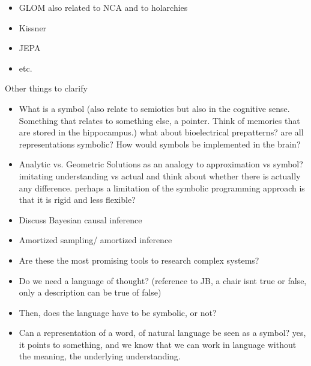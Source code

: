 \begin{itemize}
    \item GLOM also related to NCA and to holarchies
    \item Kissner
    \item JEPA
    \item etc. 
\end{itemize}










Other things to clarify
\begin{itemize}
    \item What is a symbol (also relate to semiotics but also in the cognitive sense. Something that relates to something else, a pointer. Think of memories that are stored in the hippocampus.) what about bioelectrical prepatterns? are all representations symbolic? How would symbols be implemented in the brain?
    \item Analytic vs. Geometric Solutions as an analogy to approximation vs symbol? imitating understanding vs actual and think about whether there is actually any difference. perhaps a limitation of the symbolic programming approach is that it is rigid and less flexible?
\end{itemize}




\begin{itemize}
    \item Discuss Bayesian causal inference
    \item Amortized sampling/ amortized inference
    \item Are these the most promising tools to research complex systems?
    \item Do we need a language of thought? (reference to JB, a chair isnt true or false, only a description can be true of false)
    \item Then, does the language have to be symbolic, or not? 
    \item Can a representation of a word, of natural language be seen as a symbol? yes, it points to something, and we know that we can work in language without the meaning, the underlying understanding. 
\end{itemize}

